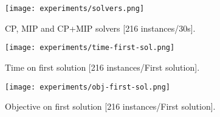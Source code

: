 \documentclass[../../thesis.tex]{subfiles}
\begin{document}
\begin{figure}
  \centering
  \texttt{[image: experiments/solvers.png]}
  \caption{CP, MIP and CP+MIP solvers [216 instances/30s].}
  \label{experiments:solvers:3}
\end{figure}


\begin{figure}
  \centering
  \texttt{[image: experiments/time-first-sol.png]}
  \caption{Time on first solution [216 instances/First solution].}
  \label{experiments:first-sol-time}
\end{figure}


\begin{figure}
  \centering
  \texttt{[image: experiments/obj-first-sol.png]}
  \caption{Objective on first solution [216 instances/First solution].}
  \label{experiments:first-sol-obj}
\end{figure}
\end{document}
